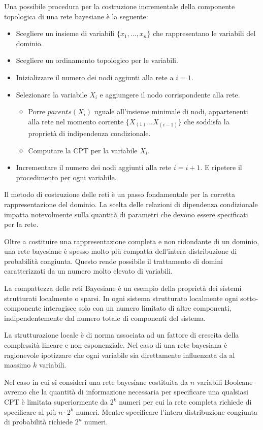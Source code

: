 Una possibile procedura per la costruzione incrementale della componente topologica
di una rete bayesiane è la seguente:
\begin{itemize}
    \item Scegliere un insieme di variabili $\{x_1, \dots, x_n\}$ che rappresentano
          le variabili del dominio.
    \item Scegliere un ordinamento topologico per le variabili.
    \item Inizializzare il numero dei nodi aggiunti alla rete a $i = 1$.
    \item Selezionare la variabile $X_i$ e aggiungere il nodo corrispondente alla
          rete.
          \begin{itemize}
              \item Porre $parents(X_i)$ uguale all'insieme minimale di nodi,
                    appartenenti alla rete nel momento corrente $\{X_{(1)} \dots X_{(i-1)}\}$
                    che soddisfa la proprietà di indipendenza condizionale.
              \item Computare la CPT per la variabile $X_i$.
          \end{itemize}
    \item Incrementare il numero dei nodi aggiunti alla rete $i=i+1$. E ripetere il
          procedimento per ogni variabile.
\end{itemize}
Il metodo di costruzione delle reti è un passo fondamentale per la corretta
rappresentazione del dominio. La scelta delle relazioni di dipendenza condizionale
impatta notevolmente sulla quantità di parametri che devono essere specificati
per la rete.

Oltre a costituire una rappresentazione completa e non ridondante di un dominio,
una rete bayesiane è spesso molto più compatta dell'intera distribuzione di
probabilità congiunta. Questo rende possibile il trattamento di domini
caratterizzati da un numero molto elevato di variabili.

La compattezza delle reti Bayesiane è un esempio della proprietà dei sistemi
strutturati localmente o sparsi. In ogni sistema strutturato localmente ogni
sotto-componente interagisce solo con un numero limitato di altre componenti,
indipendentemente dal numero totale di componenti del sistema.

La strutturazione locale è di norma associata ad un fattore di crescita della
complessità lineare e non esponenziale. Nel caso di una rete bayesiana è
ragionevole ipotizzare che ogni variabile sia direttamente influenzata da al
massimo $k$ variabili.
\begin{esempio}
    Nel caso in cui si consideri una rete bayesiane costituita da $n$ variabili
    Booleane avremo che la quantità di informazione necessaria per specificare
    una qualsiasi CPT è limitata superiormente da $2^k$ numeri per cui la rete
    completa richiede di specificare al più $n \cdot 2^k$ numeri. Mentre
    specificare l'intera distribuzione congiunta di probabilità richiede $2^n$
    numeri.
\end{esempio}
